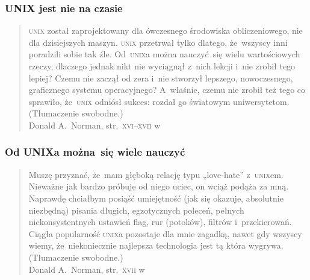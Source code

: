 \documentclass[10pt,t]{beamer}
\begin{document}
\begin{frame}
  \frametitle{UNIX jest nie na czasie}


  \begin{quote}

    \textsc{unix} został zaprojektowany dla ówczesnego środowiska
    obliczeniowego, nie dla dzisiejszych maszyn. \textsc{unix} przetrwał
    tylko dlatego, że~wszyscy inni poradzili sobie tak źle.
    Od~\textsc{unix}a można nauczyć~się wielu wartościowych rzeczy,
    dlaczego jednak nikt nie wyciągnął z~nich lekcji i~nie zrobił
    tego lepiej? Czemu nie zaczął od zera i~nie stworzył lepszego,
    nowoczesnego, graficznego systemu operacyjnego? A~właśnie, czemu nie
    zrobił też tego co sprawiło, że~\textsc{unix} odniósł sukces: rozdał go
    światowym uniwersytetom. (Tłumaczenie swobodne.) \\
    Donald A.~Norman, str.~\textsc{xvi}--\textsc{xvii}
    w~\parencite{Garfinkel-Weise-Strassmann-The-UNIX-HATERS-Handbook-Pub-1994}

  \end{quote}

\end{frame}





\begin{frame}
  \frametitle{Od UNIXa można~się wiele nauczyć}


  \begin{quote}

    Muszę przyznać, że~mam głęboką relację typu „love-hate”
    z~\textsc{unix}em.
    Nieważne jak bardzo próbuję od niego uciec, on wciąż podąża za mną.
    Naprawdę chciałbym posiąść umiejętność (jak się okazuje, absolutnie
    niezbędną) pisania długich, egzotycznych poleceń, pełnych
    niekonsystentnych ustawień flag, rur (potoków), filtrów i~przekierowań.
    Ciągła
    popularność \textsc{unix}a pozostaje dla mnie zagadką, nawet gdy
    wszyscy wiemy, że~niekoniecznie najlepsza technologia jest tą która
    wygrywa. (Tłumaczenie swobodne.) \\
    Donald A.~Norman, str.~\textsc{xvii}
    w~\parencite{Garfinkel-Weise-Strassmann-The-UNIX-HATERS-Handbook-Pub-1994}

  \end{quote}

\end{frame}
\end{document}
